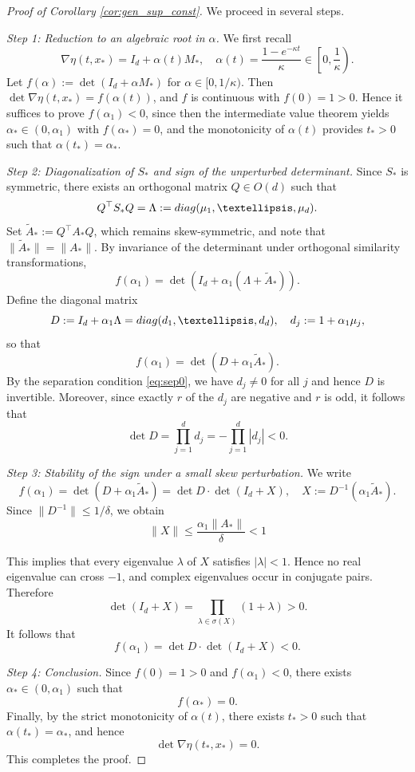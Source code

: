 \documentclass[10pt,a4paper]{amsart}
\newcommand{\diag}{{\rm diag}}
\renewcommand{\le}{\leqslant}
\newcommand{\lt}{\left}
\newcommand{\rt}{\right}
\begin{document}
\begin{proof}[Proof of Corollary \ref{cor:gen_sup_const}]
We proceed in several steps. 

\medskip
\noindent
\textit{Step 1: Reduction to an algebraic root in $\alpha$.}
We first recall
\[
\nabla\eta(t,x_*)=I_d+\alpha(t)M_*, \quad \alpha(t)=\frac{1-e^{-\kappa t}}{\kappa}\in \lt[0,\frac1\kappa\rt).
\]
Let $f(\alpha):=\det(I_d+\alpha M_*)$ for $\alpha\in[0,1/\kappa)$. Then $\det\nabla\eta(t,x_*)=f(\alpha(t))$, and $f$ is continuous with $f(0)=1>0$. Hence it suffices to prove $f(\alpha_1)<0$, since then the intermediate value theorem yields $\alpha_*\in(0,\alpha_1)$ with $f(\alpha_*)=0$, and the monotonicity of $\alpha(t)$ provides $t_*>0$ such that $\alpha(t_*)=\alpha_*$.

\medskip
\noindent
\textit{Step 2: Diagonalization of $S_*$ and sign of the unperturbed determinant.}
Since $S_*$ is symmetric, there exists an orthogonal matrix $Q\in O(d)$ such that
\[
Q^\top S_*Q=\Lambda:=\diag(\mu_1,\dots,\mu_d).
\]
Set $\widetilde A_*:=Q^\top A_*Q$, which remains skew-symmetric, and note that $\|\widetilde A_*\|=\|A_*\|$.
By invariance of the determinant under orthogonal similarity transformations,
\[
f(\alpha_1)=\det \lt(I_d+\alpha_1(\Lambda+\widetilde A_*)\rt).
\]
Define the diagonal matrix
\[
D:=I_d+\alpha_1\Lambda=\diag(d_1,\dots,d_d), \quad d_j:=1+\alpha_1\mu_j,
\]
so that
\[
f(\alpha_1)=\det(D+\alpha_1\widetilde A_*).
\]
By the separation condition \eqref{eq:sep0}, we have $d_j\neq0$ for all $j$ and hence $D$ is invertible.
Moreover, since exactly $r$ of the $d_j$ are negative and $r$ is odd, it follows that
\[
\det D=\prod_{j=1}^d d_j= -\prod_{j=1}^d |d_j|< 0.
\]

\medskip
\noindent
\textit{Step 3: Stability of the sign under a small skew perturbation.}
We write
\[
f(\alpha_1)=\det(D+\alpha_1\widetilde A_*)
=\det D \cdot \det(I_d+X),
\quad
X:=D^{-1}(\alpha_1\widetilde A_*).
\]
Since $\|D^{-1}\|\le 1/\delta$, we obtain
\[
\|X\|\le \frac{\alpha_1\|A_*\|}{\delta}<1
\]

This implies that every eigenvalue $\lambda$ of $X$ satisfies $|\lambda|<1$. Hence no real eigenvalue can cross $-1$, and complex eigenvalues occur in conjugate pairs. Therefore
\[
\det(I_d+X)=\prod_{\lambda\in\sigma(X)}(1+\lambda)>0.
\]
It follows that
\[
f(\alpha_1)=\det D \cdot \det(I_d+X)<0.
\]

\medskip
\noindent
\textit{Step 4: Conclusion.}
Since $f(0)=1>0$ and $f(\alpha_1)<0$, there exists $\alpha_*\in(0,\alpha_1)$ such that
\[
f(\alpha_*)=0.
\]
Finally, by the strict monotonicity of $\alpha(t)$, there exists $t_*>0$ such that $\alpha(t_*)=\alpha_*$, and hence
\[
\det\nabla\eta(t_*,x_*)=0.
\]
This completes the proof.
\end{proof}
\end{document}
